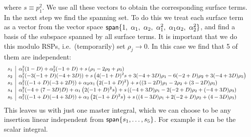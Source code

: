 where $s\equiv p_1^2$.
We use all these vectors to obtain the corresponding surface terms. 
In the next step we find the spanning set.
To do this we treat each surface term as a vector from the vector space 
$\mathsf{span}\{1,~ \alpha_1,~ \alpha_2,~\alpha_1^2,~\alpha_1\alpha_2,~\alpha_2^2\}$,
and find a basis of the subspace spanned by all surface terms. 
It is important that we do this modulo RSPs, i.e.\ (temporarily) set $\rho_j\to 0$.
In this case we find that 5 of them are independent:
\begin{equation*}
  \small
  \begin{array}{l|l}
    s_1 & \alpha _1^2 (1-D)+\alpha _2^2 (-1+D)+s \left(\rho _1-2 \rho _2+\rho _3\right) \\
    s_2 & \alpha _1^2 (-3 (-1+D) (-4+3 D))+s \left(4 (-1+D)^2 s+3 (-4+3 D) \rho _1-6 (-2+D) \rho _2+3 (-4+3 D) \rho _3\right) \\
    s_3 & \alpha _1^2 ((-1+D) (-3+2 D))+\alpha _2 \alpha _1 \left(2 (-1+D)^2\right)+s \left((3-2 D) \rho _1-2 \rho _2+(3-2 D) \rho _3\right) \\
    s_4 & \alpha _1^2 (-4+(7-3 D) D)+\alpha _1 \left(2 (-1+D)^2 s\right)+s \left((-4+3 D) \rho _1-2 (-2+D) \rho _2+(-4+3 D) \rho _3\right) \\
    s_5 & \alpha _1^2 ((-1+D) (-4+3 D))+\alpha _2 \left(2 (-1+D)^2 s\right)+s \left((4-3 D) \rho _1+2 (-2+D) \rho _2+(4-3 D) \rho _3\right) \\
  \end{array}
\end{equation*}
This leaves us with just one master integral, which
we can choose to be any insertion linear independent from $\mathsf{span}\{s_1,\ldots{},s_5\}$.
For example it can be the scalar integral.







